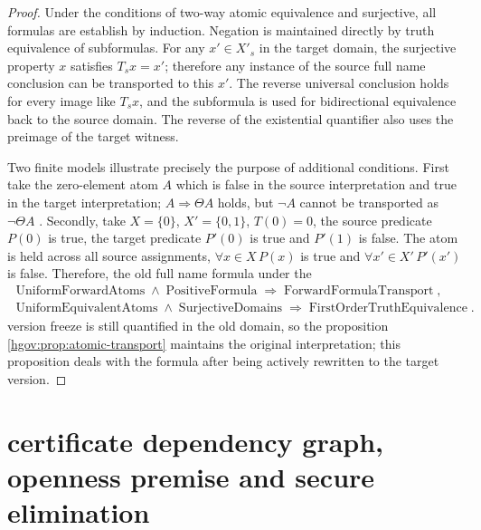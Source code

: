 \documentclass[12pt,a4paper,openany,notitlepage]{report}
\theoremstyle{plain}
\theoremstyle{definition}
\theoremstyle{remark}
\begin{document}
\begin{CJK*}
\begin{proof}
Under the conditions of two-way atomic equivalence and surjective, all formulas are establish by induction. Negation is maintained directly by truth equivalence of subformulas. For any $x'\in X'_s$ in the target domain, the surjective property $x$ satisfies $T_sx=x'$; therefore any instance of the source full name conclusion can be transported to this $x'$. The reverse universal conclusion holds for every image like $T_sx$, and the subformula is used for bidirectional equivalence back to the source domain. The reverse of the existential quantifier also uses the preimage of the target witness.

Two finite models illustrate precisely the purpose of additional conditions. First take the zero-element atom $A$ which is false in the source interpretation and true in the target interpretation; $A\Rightarrow\Theta A$ holds, but $\neg A$ cannot be transported as $\neg\Theta A$ . Secondly, take $X=\{0\}$, $X'=\{0,1\}$, $T(0)=0$, the source predicate $P(0)$ is true, the target predicate $P'(0)$ is true and $P'(1)$ is false. The atom is held across all source assignments, $\forall x\in X\,P(x)$ is true and $\forall x'\in X'\,P'(x')$ is false. Therefore, the old full name formula under the \[
\begin{gathered}
 \operatorname{UniformForwardAtoms}\land\operatorname{PositiveFormula}
 \Rightarrow\operatorname{ForwardFormulaTransport},\\
 \operatorname{UniformEquivalentAtoms}\land\operatorname{SurjectiveDomains}
 \Rightarrow\operatorname{FirstOrderTruthEquivalence}.
\end{gathered}
\] version freeze is still quantified in the old domain, so the proposition ~ \ref{hgov:prop:atomic-transport} maintains the original interpretation; this proposition deals with the formula after being actively rewritten to the target version.\end{proof}


\section { certificate dependency graph, openness premise and secure elimination }\label{exp:gov:proof-ledger-section}



\end{CJK*}
\end{document}
